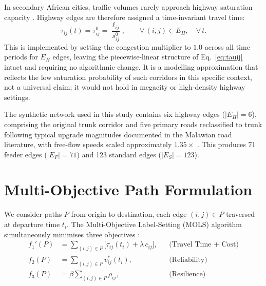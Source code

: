 \documentclass[paper=A4, 12pt, mathscr]{report}
\begin{document}
	In secondary African cities, traffic volumes rarely approach highway
	saturation capacity \cite{gonzalez2023}. Highway edges are therefore
	assigned a time-invariant travel time:
	\begin{equation}
		\tau_{ij}(t) = \tau_{ij}^{0} = \frac{\ell_{ij}}{s_{ij}^{0}},
		\qquad \forall\,(i,j)\in E_H,\quad \forall\,t.
		\label{eq:hw_const}
	\end{equation}
	This is implemented by setting the congestion multiplier to $1.0$ across
	all time periods for $E_H$ edges, leaving the piecewise-linear structure
	of Eq.~\eqref{eq:tauij} intact and requiring no algorithmic change. It
	is a modelling approximation that reflects the low saturation probability
	of such corridors in this specific context, not a universal claim; it
	would not hold in megacity or high-density highway settings.
	
	The synthetic network used in this study contains six highway edges
	($|E_H|=6$), comprising the original trunk corridor and five primary roads
	reclassified to trunk following typical upgrade magnitudes documented in
	the Malawian road literature, with free-flow speeds scaled approximately
	$1.35\times$ \cite{gonzalez2023,dumas2025}. This produces 71 feeder edges
	($|E_F|=71$) and 123 standard edges ($|E_S|=123$).
	
	\section{Multi-Objective Path Formulation}
	
	We consider paths $P$ from origin to destination, each edge $(i,j)\in P$
	traversed at departure time $t_i$. The Multi-Objective Label-Setting
	(MOLS) algorithm simultaneously minimises three objectives
	\cite{14,16,du}:
	\begin{equation}
		\begin{aligned}
			f_1'(P) &= \sum_{(i,j)\in P} \bigl[\tau_{ij}(t_i)
			+ \lambda\,c_{ij}\bigr],
			&& \text{(Travel Time + Cost)} \\[4pt]
			f_2(P)  &= \sum_{(i,j)\in P} v^*_{ij}(t_i),
			&& \text{(Reliability)} \\[4pt]
			f_3(P)  &= \beta\sum_{(i,j)\in P} \rho_{ij},
			&& \text{(Resilience)}
		\end{aligned}
		\label{eq:mop}
	\end{equation}
	
\end{document}
